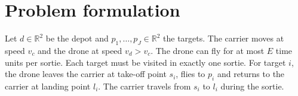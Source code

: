 \documentclass[preprint,12pt,authoryear]{elsarticle}
\begin{document}
\begin{table}[t]
\centering
\caption{Closest work compared on properties relevant to this paper. Liu et al. (2026), Yan et al. (2026) and Lee et al. (2023) are omitted because their full texts have not been read.}
\label{tab:gap}
\small
{}
\end{table}

\section{Problem formulation}
\label{sec:problem}

Let $d \in \mathbb{R}^{2}$ be the depot and $p_{1},\dots,p_{J} \in \mathbb{R}^{2}$ the targets. The carrier moves at speed $v_{c}$ and the drone at speed $v_{d} > v_{c}$. The drone can fly for at most $E$ time units per sortie. Each target must be visited in exactly one sortie. For target $i$, the drone leaves the carrier at take-off point $s_{i}$, flies to $p_{i}$ and returns to the carrier at landing point $l_{i}$. The carrier travels from $s_{i}$ to $l_{i}$ during the sortie.
\end{document}
